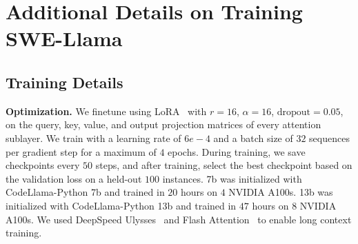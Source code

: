 \section{Additional Details on Training SWE-Llama}
\label{appx:swe-llama}

\subsection{Training Details}
\textbf{Optimization.} We finetune using LoRA~\citep{hu2022lora} with $r=16$, $\alpha=16$, $\text{dropout}=0.05$, on the query, key, value, and output projection matrices of every attention sublayer.
We train with a learning rate of $6e-4$ and a batch size of $32$ sequences per gradient step for a maximum of $4$ epochs.
During training, we save checkpoints every $50$ steps, and after training, select the best checkpoint based on the validation loss on a held-out $100$ instances.
\swellama{} 7b was initialized with CodeLlama-Python 7b and trained in $20$ hours on $4$ NVIDIA A100s.
\swellama{} 13b was initialized with CodeLlama-Python 13b and trained in $47$ hours on $8$ NVIDIA A100s.
We used DeepSpeed Ulysses~\citep{jacobs2023deepspeed} and Flash Attention~\citep{dao2022flashattention} to enable long context training.